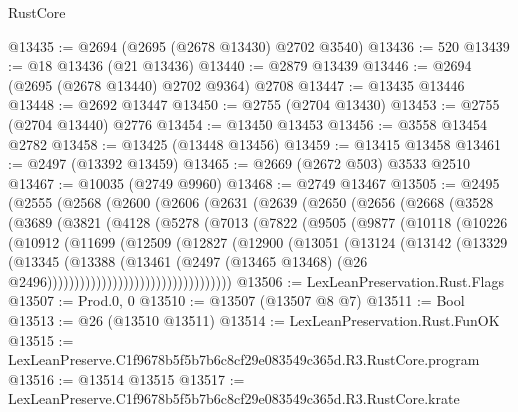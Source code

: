 \begin{lexlean}{RustCore}
\begin{coremodule}
@13435 := @2694 (@2695 (@2678 @13430) @2702 @3540)
@13436 := 520
@13439 := @18 @13436 (@21 @13436)
@13440 := @2879 @13439
@13446 := @2694 (@2695 (@2678 @13440) @2702 @9364) @2708
@13447 := @13435 @13446
@13448 := @2692 @13447
@13450 := @2755 (@2704 @13430)
@13453 := @2755 (@2704 @13440) @2776
@13454 := @13450 @13453
@13456 := @3558 @13454 @2782
@13458 := @13425 (@13448 @13456)
@13459 := @13415 @13458
@13461 := @2497 (@13392 @13459)
@13465 := @2669 (@2672 @503) @3533 @2510
@13467 := @10035 (@2749 @9960)
@13468 := @2749 @13467
@13505 := @2495
    (@2555
      (@2568
        (@2600
          (@2606
            (@2631
              (@2639
                (@2650
                  (@2656
                    (@2668
                      (@3528
                        (@3689
                          (@3821
                            (@4128
                              (@5278
                                (@7013
                                  (@7822
                                    (@9505
                                      (@9877
                                        (@10118
                                          (@10226
                                            (@10912
                                              (@11699
                                                (@12509
                                                  (@12827
                                                    (@12900
                                                      (@13051
                                                        (@13124
                                                          (@13142
                                                            (@13329
                                                              (@13345
                                                                (@13388
                                                                  (@13461
                                                                    (@2497
                                                                      (@13465 @13468)
                                                                      (@26
                                                                        @2496))))))))))))))))))))))))))))))))))
@13506 := LexLeanPreservation.Rust.Flags
@13507 := Prod.{0, 0}
@13510 := @13507 (@13507 @8 @7)
@13511 := Bool
@13513 := @26 (@13510 @13511)
@13514 := LexLeanPreservation.Rust.FunOK
@13515 := LexLeanPreserve.C1f9678b5f5b7b6c8cf29e083549c365d.R3.RustCore.program
@13516 := @13514 @13515
@13517 := LexLeanPreserve.C1f9678b5f5b7b6c8cf29e083549c365d.R3.RustCore.krate

\end{coremodule}
\end{lexlean}
